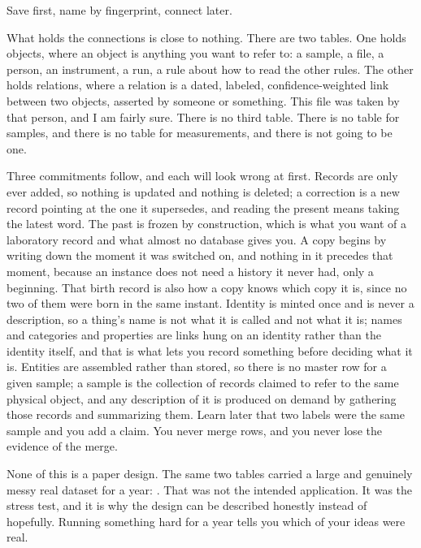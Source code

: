 Save first, name by fingerprint, connect later.

What holds the connections is close to nothing. There are two tables. One holds objects, where an object is anything you want to refer to: a sample, a file, a person, an instrument, a run, a rule about how to read the other rules. The other holds relations, where a relation is a dated, labeled, confidence-weighted link between two objects, asserted by someone or something. This file was taken by that person, and I am fairly sure. There is no third table. There is no table for samples, and there is no table for measurements, and there is not going to be one.

Three commitments follow, and each will look wrong at first. Records are only ever added, so nothing is updated and nothing is deleted; a correction is a new record pointing at the one it supersedes, and reading the present means taking the latest word. The past is frozen by construction, which is what you want of a laboratory record and what almost no database gives you. A copy begins by writing down the moment it was switched on, and nothing in it precedes that moment, because an instance does not need a history it never had, only a beginning. That birth record is also how a copy knows which copy it is, since no two of them were born in the same instant. Identity is minted once and is never a description, so a thing's name is not what it is called and not what it is; names and categories and properties are links hung on an identity rather than the identity itself, and that is what lets you record something before deciding what it is. Entities are assembled rather than stored, so there is no master row for a given sample; a sample is the collection of records claimed to refer to the same physical object, and any description of it is produced on demand by gathering those records and summarizing them. Learn later that two labels were the same sample and you add a claim. You never merge rows, and you never lose the evidence of the merge.

None of this is a paper design. The same two tables carried a large and genuinely messy real dataset for a year: \labLineageCorpus{}. That was not the intended application. It was the stress test, and it is why the design can be described honestly instead of hopefully. Running something hard for a year tells you which of your ideas were real.

